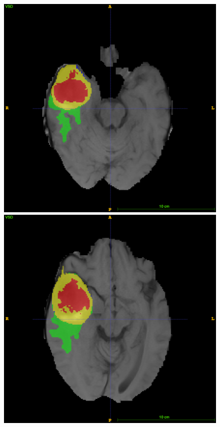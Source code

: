 \documentclass[12pt,a4paper,twoside,openright]{report}
\begin{document}
\begin{figure}
	\includegraphics[scale=0.1]{expert_segmentation_69}
	\includegraphics[scale=0.1]{expert_segmentation_79}

\end{figure}
\end{document}
